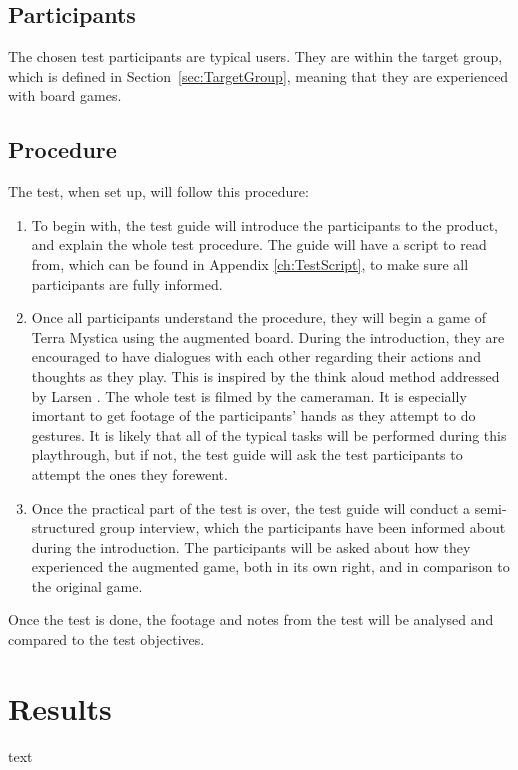 \subsection{Participants}
The chosen test participants are typical users. They are within the target group, which is defined in Section~\ref{sec:TargetGroup}, meaning that they are experienced with board games. 

\subsection{Procedure}
The test, when set up, will follow this procedure:

\begin{enumerate}
\item To begin with, the test guide will introduce the participants to the product, and explain the whole test procedure. The guide will have a script to read from, which can be found in Appendix \ref{ch:TestScript}, to make sure all participants are fully informed.
\item Once all participants understand the procedure, they will begin a game of Terra Mystica using the augmented board. During the introduction, they are encouraged to have dialogues with each other regarding their actions and thoughts as they play. This is inspired by the think aloud method addressed by Larsen \citep{TestingLecture}. The whole test is filmed by the cameraman. It is especially imortant to get footage of the participants' hands as they attempt to do gestures. It is likely that all of the typical tasks will be performed during this playthrough, but if not, the test guide will ask the test participants to attempt the ones they forewent.
\item Once the practical part of the test is over, the test guide will conduct a semi-structured group  interview, which the participants have been informed about during the introduction. The participants will be asked about how they experienced the augmented game, both in its own right, and in comparison to the original game.
\end{enumerate}

Once the test is done, the footage and notes from the test will be analysed and compared to the test objectives.

\section{Results}
text